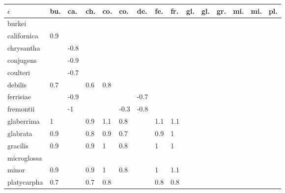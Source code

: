\begin{table}[ht]
\centering
\begin{tabular}{lllllllllllllll}
  \hline
$\epsilon$ & bu. & ca. & ch. & co. & co. & de. & fe. & fr. & gl. & gl. & gr. & mi. & mi. & pl. \\ 
  \hline
burkei &  &  &  &  &  &  &  &  &  &  &  &  &  &  \\ 
  californica & 0.9 &  &  &  &  &  &  &  &  &  &  &  &  &  \\ 
  chrysantha &  & -0.8 &  &  &  &  &  &  &  &  &  &  &  &  \\ 
  conjugens &  & -0.9 &  &  &  &  &  &  &  &  &  &  &  &  \\ 
  coulteri &  & -0.7 &  &  &  &  &  &  &  &  &  &  &  &  \\ 
  debilis & 0.7 &  & 0.6 & 0.8 &  &  &  &  &  &  &  &  &  &  \\ 
  ferrisiae &  & -0.9 &  &  &  & -0.7 &  &  &  &  &  &  &  &  \\ 
  fremontii &  & -1 &  &  & -0.3 & -0.8 &  &  &  &  &  &  &  &  \\ 
  glaberrima & 1 &  & 0.9 & 1.1 & 0.8 &  & 1.1 & 1.1 &  &  &  &  &  &  \\ 
  glabrata & 0.9 &  & 0.8 & 0.9 & 0.7 &  & 0.9 & 1 &  &  &  &  &  &  \\ 
  gracilis & 0.9 &  & 0.9 & 1 & 0.8 &  & 1 & 1 &  &  &  &  &  &  \\ 
  microglossa &  &  &  &  &  &  &  &  &  &  &  &  &  &  \\ 
  minor & 0.9 &  & 0.9 & 1 & 0.8 &  & 1 & 1.1 &  &  &  &  &  &  \\ 
  platycarpha & 0.7 &  & 0.7 & 0.8 &  &  & 0.8 & 0.8 &  &  &  &  &  &  \\ 
   \hline
\end{tabular}
\end{table}
